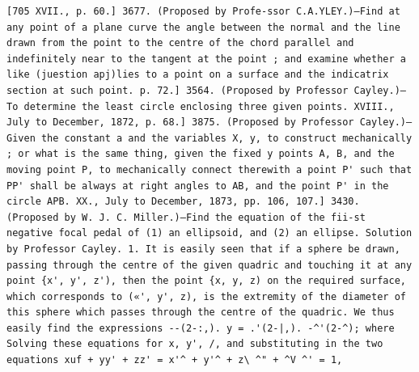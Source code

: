 \documentclass[12pt]{article}
\theoremstyle{plain}
\begin{document}
\newpage
\setcounter{page}{576}
\begin{verbatim}
[705 XVII., p. 60.] 3677. (Proposed by Profe-ssor C.A.YLEY.)—Find at any point of a plane curve the angle between the normal and the line drawn from the point to the centre of the chord parallel and indefinitely near to the tangent at the point ; and examine whether a like (juestion apj)lies to a point on a surface and the indicatrix section at such point. p. 72.] 3564. (Proposed by Professor Cayley.)—To determine the least circle enclosing three given points. XVIII., July to December, 1872, p. 68.] 3875. (Proposed by Professor Cayley.)—Given the constant a and the variables X, y, to construct mechanically ; or what is the same thing, given the fixed y points A, B, and the moving point P, to mechanically connect therewith a point P' such that PP' shall be always at right angles to AB, and the point P' in the circle APB. XX., July to December, 1873, pp. 106, 107.] 3430. (Proposed by W. J. C. Miller.)—Find the equation of the fii-st negative focal pedal of (1) an ellipsoid, and (2) an ellipse. Solution by Professor Cayley. 1. It is easily seen that if a sphere be drawn, passing through the centre of the given quadric and touching it at any point {x', y', z'), then the point {x, y, z) on the required surface, which corresponds to («', y', z), is the extremity of the diameter of this sphere which passes through the centre of the quadric. We thus easily find the expressions --(2-:,). y = .'(2-|,). -^'(2-^); where Solving these equations for x, y', /, and substituting in the two equations xuf + yy' + zz' = x'^ + y'^ + z\ ^" + ^V ^' = 1, 
\end{verbatim}
\end{document}
